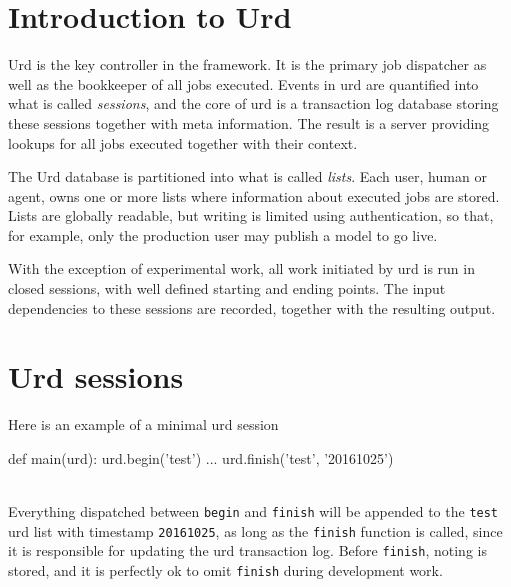 \section{Introduction to Urd}

Urd is the key controller in the framework.  It is the primary job
dispatcher as well as the bookkeeper of all jobs executed.  Events in
urd are quantified into what is called \textsl{sessions}, and the core
of urd is a transaction log database storing these sessions together
with meta information.  The result is a server providing lookups for
all jobs executed together with their context.

The Urd database is partitioned into what is called \textsl{lists}.
Each user, human or agent, owns one or more lists where information
about executed jobs are stored.  Lists are globally readable, but
writing is limited using authentication, so that, for example, only
the production user may publish a model to go live.

With the exception of experimental work, all work initiated by urd is
run in closed sessions, with well defined starting and ending points.
The input dependencies to these sessions are recorded, together with
the resulting output.



\section{Urd sessions}

Here is an example of a minimal urd session
\\
\begin{python}
def main(urd):
  urd.begin('test')
  ...
  urd.finish('test', '20161025')
\end{python}
\\
Everything dispatched between \texttt{begin} and \texttt{finish} will
be appended to the \texttt{test} urd list with timestamp
\texttt{20161025}, as long as the \texttt{finish} function is called,
since it is responsible for updating the urd transaction log.  Before
\texttt{finish}, noting is stored, and it is perfectly ok to omit
\texttt{finish} during development work.

